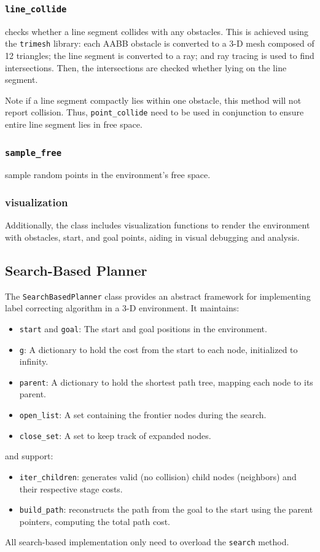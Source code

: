 \documentclass[conference]{IEEEtran}
\begin{document}
\subsubsection{\texttt{line\_collide}}
checks whether a line segment collides with any obstacles.
This is achieved using the \texttt{trimesh} library:
each AABB obstacle is converted to a 3-D mesh composed of 12 triangles;
the line segment is converted to a ray;
and ray tracing is used to find intersections.
Then, the intersections are checked whether lying on the line segment.

Note if a line segment compactly lies within one obstacle, 
this method will not report collision.
Thus, \texttt{point\_collide} need to be used in conjunction 
to ensure entire line segment lies in free space.

\subsubsection{\texttt{sample\_free}}
sample random points in the environment's free space.

\subsubsection{visualization}
Additionally, the class includes visualization functions
to render the environment with obstacles, start, and goal points, 
aiding in visual debugging and analysis.

\subsection{Search-Based Planner}
The \texttt{SearchBasedPlanner} class provides an abstract framework for 
implementing label correcting algorithm in a 3-D environment. 
It maintains:
\begin{itemize}
    \item \texttt{start} and \texttt{goal}: The start and goal positions in the environment.
    \item \texttt{g}: A dictionary to hold the cost from the start to each node, initialized to infinity.
    \item \texttt{parent}: A dictionary to hold the shortest path tree, mapping each node to its parent.
    \item \texttt{open\_list}: A set containing the frontier nodes during the search.
    \item \texttt{close\_set}: A set to keep track of expanded nodes.
\end{itemize}
and support:
\begin{itemize}
    \item \texttt{iter\_children}: generates valid (no collision) child nodes (neighbors) and their respective stage costs.
    \item \texttt{build\_path}: reconstructs the path from the goal to the start using the parent pointers, computing the total path cost.
\end{itemize}
All search-based implementation only need to overload the \texttt{search} method.
\end{document}
